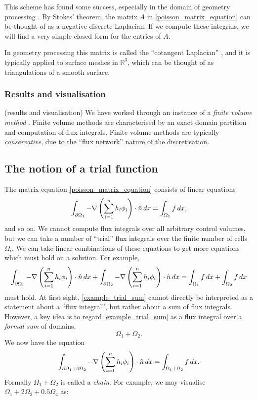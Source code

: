 This scheme has found some success, especially in the domain of geometry processing \cite{polygon_mesh_processing}.
By Stokes' theorem, the matrix $A$ in \eqref{poisson_matrix_equation} can be thought of as a negative discrete Laplacian.
If we compute these integrals, we will find a very simple closed form for the entries of $A$.

In geometry processing this matrix is called the ``cotangent Laplacian'' \cite{polygon_mesh_processing}, and it is typically
applied to surface meshes in $\mathbb{R}^3$, which can be thought of as triangulations of a smooth surface.

\subsubsection{Results and visualisation}
\vskip 0.2in
(results and visualisation)
\vskip 0.2in
We have worked through an instance of a \textit{finite volume method} \cite{pde_larsson}.
Finite volume methods are characterised by an exact domain partition and computation of flux integrals.
Finite volume methods are typically \textit{conservative}, due to the ``flux network'' nature of the discretisation.
\subsection{The notion of a trial function}\label{trial_function}
The matrix equation \eqref{poisson_matrix_equation} consists of linear equations
\begin{align*}
    \int_{{\partial\Omega}_1} -\nabla \left(\sum_{i=1}^n h_i\phi_i\right) \cdot \hat{n}\,dx
    =
    \int_{{\Omega}_1}f\,dx,
\end{align*}
and so on. We cannot compute flux integrals
over all arbitrary control volumes, but we can take a number of ``trial'' flux integrals over the finite number of cells $\Omega_i$.
We can take linear combinations of these equations to get more equations which must hold on a solution.
For example,
\begin{equation}\label{example_trial_sum}
    \int_{{\partial\Omega}_1} -\nabla \left(\sum_{i=1}^n h_i\phi_i\right) \cdot \hat{n}\,dx
    +
    \int_{{\partial\Omega}_2} -\nabla \left(\sum_{i=1}^n h_i\phi_i\right) \cdot \hat{n}\,dx
    =
    \int_{{\Omega}_1}f\,dx
    +
    \int_{{\Omega}_2}f\,dx
\end{equation}
must hold. At first sight, \eqref{example_trial_sum} cannot directly be interpreted as a statement about a ``flux integral'', but rather about a sum
of flux integrals. However, a key idea is to regard \eqref{example_trial_sum} as a flux integral over a \textit{formal sum} of domains,
    $$\Omega_1 + \Omega_2.$$
We now have the equation
\begin{equation}
    \int_{{\partial\Omega}_1 + {\partial\Omega}_2} -\nabla \left(\sum_{i=1}^n h_i\phi_i\right) \cdot \hat{n}\,dx
    =
    \int_{{\Omega}_1 + {\Omega}_2}f\,dx.
\end{equation}
Formally $\Omega_1 + \Omega_2$ is called a \textit{chain}. For example, we may visualise $\Omega_1 + 2\Omega_2 + 0.5\Omega_4$ as:

